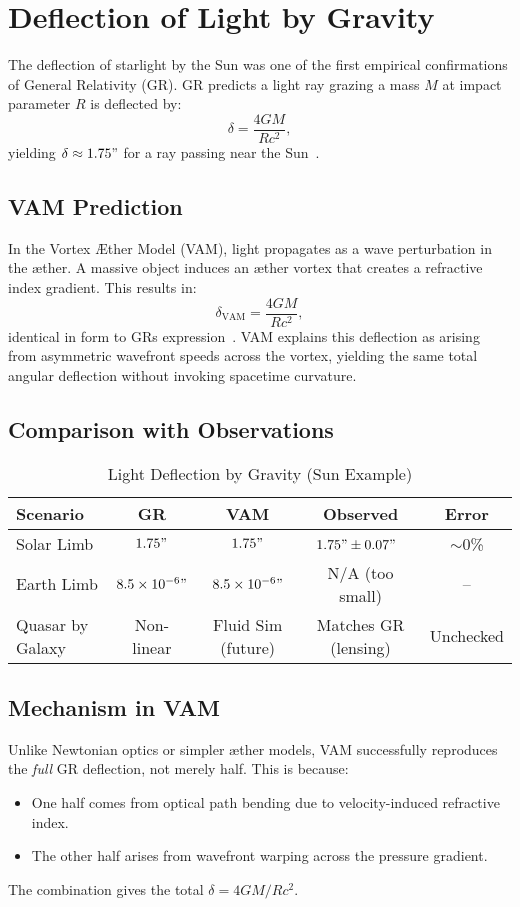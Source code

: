 \section{Deflection of Light by Gravity}

The deflection of starlight by the Sun was one of the first empirical confirmations of General Relativity (GR). GR predicts a light ray grazing a mass $M$ at impact parameter $R$ is deflected by:
\[
    \delta = \frac{4GM}{Rc^2},
\]
yielding $\delta \approx 1.75"$ for a ray passing near the Sun~\cite{will2014confrontation}.

\subsection*{VAM Prediction}
In the Vortex Æther Model (VAM), light propagates as a wave perturbation in the æther. A massive object induces an æther vortex that creates a refractive index gradient. This results in:
\[
    \delta_\text{VAM} = \frac{4GM}{Rc^2},
\]
identical in form to GR\rqs s expression~\cite{iskandarani2025VAM2}. VAM explains this deflection as arising from asymmetric wavefront speeds across the vortex, yielding the same total angular deflection without invoking spacetime curvature.

\subsection*{Comparison with Observations}

\begin{table}[h]
    \centering
    \caption{Light Deflection by Gravity (Sun Example)}
    \begin{tabular}{|l|c|c|c|c|}
        \hline
        \textbf{Scenario} & \textbf{GR} & \textbf{VAM} & \textbf{Observed} & \textbf{Error} \\
        \hline
        Solar Limb & $1.75"$ & $1.75"$ & $1.75" \pm 0.07"$~\cite{shapiro2004gravitational} & $\sim$0\% \\
        Earth Limb & $8.5\times10^{-6}"$ & $8.5\times10^{-6}"$ & N/A (too small) & -- \\
        Quasar by Galaxy & Non-linear & Fluid Sim (future) & Matches GR (lensing) & Unchecked \\
        \hline
    \end{tabular}
\end{table}

\subsection*{Mechanism in VAM}
Unlike Newtonian optics or simpler æther models, VAM successfully reproduces the \textit{full} GR deflection, not merely half. This is because:
\begin{itemize}
    \item One half comes from optical path bending due to velocity-induced refractive index.
    \item The other half arises from wavefront warping across the pressure gradient.
\end{itemize}
The combination gives the total $\delta = 4GM/Rc^2$.

